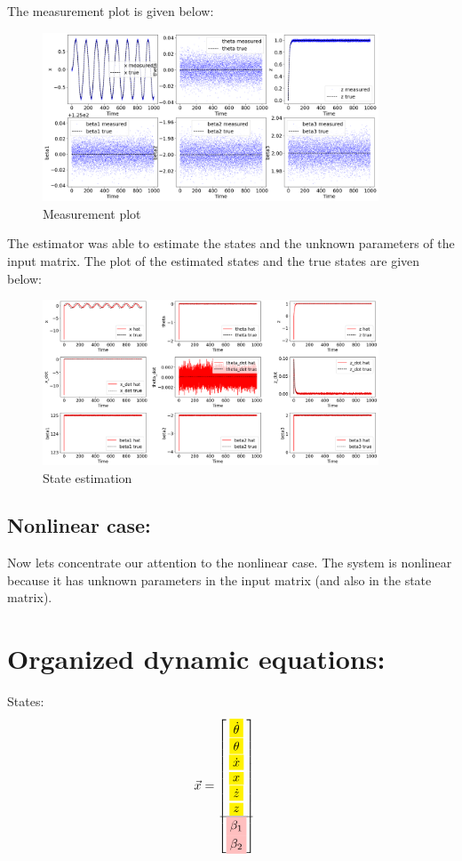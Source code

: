 \documentclass[12pt]{article}
\begin{document}
The measurement plot is given below:
\begin{figure}[h!]
    \centering
    \includegraphics[width=10cm]{figures/phase_02_measurement1.png}
    \caption{Measurement plot}
    \label{fig:03}
\end{figure}
The estimator was able to estimate the states and the unknown parameters of the input matrix. The plot of the estimated states and the true states are given below:
\begin{figure}[h!]
    \centering
    \includegraphics[width=10cm]{figures/phase_02_states1.png}
    \caption{State estimation}
    \label{fig:04}
\end{figure}

\subsection*{Nonlinear case:}
Now lets concentrate our attention to the nonlinear case. The system is nonlinear because it has unknown parameters in the input matrix (and also in the state matrix).  

\section*{Organized dynamic equations:}

States:
\begin{align*}
    \vec{x} &= \begin{bmatrix}
        \colorbox{yellow}{$\dot{\theta}$} \\
        \colorbox{yellow}{$\theta$} \\
        \colorbox{yellow}{$\dot{x}$} \\
        \colorbox{yellow}{$x$} \\
        \colorbox{yellow}{$\dot{z}$} \\
        \colorbox{yellow}{$z$} \\
        \hline
        \colorbox{pink}{$\beta_1$} \\
        \colorbox{pink}{$\beta_2$} \\
    \end{bmatrix}
\end{align*}
\end{document}
